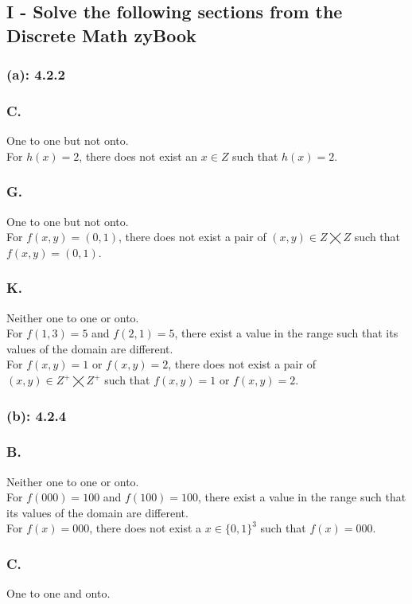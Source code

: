 \documentclass[titlepage]{article}\pagestyle{empty}
\begin{document}
\subsection*{I - Solve the following sections from the Discrete Math zyBook} 
\subsubsection*{(a): 4.2.2}
\subsubsection*{C.}
One to one but not onto.\\
For $h(x) = 2$, there does not exist an $x \in Z$ such that $h(x) = 2$.\\
\subsubsection*{G.}
One to one but not onto.\\
For $f(x, y) = (0, 1)$, there does not exist a pair of $(x, y) \in Z \bigtimes Z$ such that $f(x, y) = (0, 1)$.\\
\subsubsection*{K.}
Neither one to one or onto.\\
For $f(1, 3) = 5$ and $f(2, 1) = 5$, there exist a value in the range such that its values of the domain are different.\\
For $f(x, y) = 1$ or $f(x, y) = 2$,  there does not exist a pair of $(x, y) \in Z^+ \bigtimes Z^+$ such that $f(x, y) = 1$ or $f(x, y) = 2$.\\
\subsubsection*{(b): 4.2.4}
\subsubsection*{B.}
Neither one to one or onto.\\
For $f(000) = 100$ and $f(100) = 100$, there exist a value in the range such that its values of the domain are different.\\
For $f(x) = 000$, there does not exist a $x \in \{0, 1\}^3$ such that $f(x) = 000$.\\
\subsubsection*{C.}
One to one and onto.\\
\end{document}

